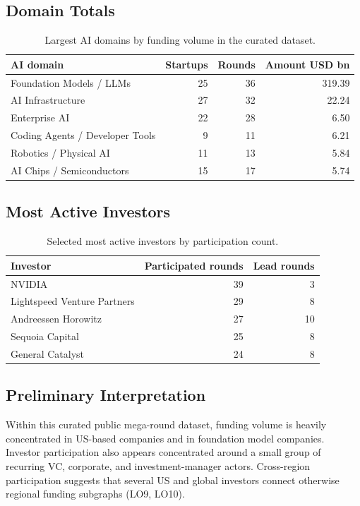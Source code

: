 \documentclass[11pt,a4paper]{article}
\begin{document}
\subsection{Domain Totals}

\begin{table}[H]
\centering
\begin{tabular}{lrrr}
\toprule
AI domain & Startups & Rounds & Amount USD bn \\
\midrule
Foundation Models / LLMs & 25 & 36 & 319.39 \\
AI Infrastructure & 27 & 32 & 22.24 \\
Enterprise AI & 22 & 28 & 6.50 \\
Coding Agents / Developer Tools & 9 & 11 & 6.21 \\
Robotics / Physical AI & 11 & 13 & 5.84 \\
AI Chips / Semiconductors & 15 & 17 & 5.74 \\
\bottomrule
\end{tabular}
\caption{Largest AI domains by funding volume in the curated dataset.}
\end{table}

\subsection{Most Active Investors}

\begin{table}[H]
\centering
\begin{tabular}{lrr}
\toprule
Investor & Participated rounds & Lead rounds \\
\midrule
NVIDIA & 39 & 3 \\
Lightspeed Venture Partners & 29 & 8 \\
Andreessen Horowitz & 27 & 10 \\
Sequoia Capital & 25 & 8 \\
General Catalyst & 24 & 8 \\
\bottomrule
\end{tabular}
\caption{Selected most active investors by participation count.}
\end{table}

\subsection{Preliminary Interpretation}

Within this curated public mega-round dataset, funding volume is heavily
concentrated in US-based companies and in foundation model companies. Investor
participation also appears concentrated around a small group of recurring VC,
corporate, and investment-manager actors. Cross-region participation suggests
that several US and global investors connect otherwise regional funding
subgraphs (LO9, LO10).
\end{document}
